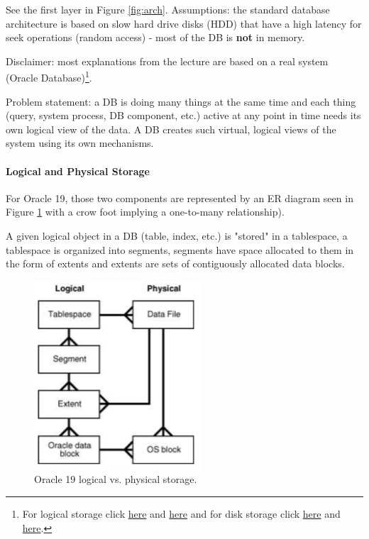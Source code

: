See the first layer in Figure \ref{fig:arch}. Assumptions: the standard database architecture is based on slow hard drive disks (HDD) that have a high latency for seek operations (random access) - most of the DB is \textbf{not} in memory.

Disclaimer: most explanations from the lecture are based on a real system (Oracle Database)\footnote{For logical storage click \href{https://docs.oracle.com/en/database/oracle/oracle-database/19/cncpt/logical-storage-structures.html#GUID-4AF2D61A-8675-4D48-97A4-B20F401ADA16}{here} and \href{https://docs.oracle.com/cd/B19306_01/server.102/b14220/logical.htm}{here} and for disk storage click \href{https://docs.oracle.com/cd/B19306_01/server.102/b14220/physical.htm}{here} and \href{https://docs.oracle.com/en/database/oracle/oracle-database/19/cncpt/physical-storage-structures.html#GUID-008A1F08-9C75-4E9F-A70B-41FB942C60B4}{here}.}. %

Problem statement: a DB is doing many things at the same time and each thing (query, system process, DB component, etc.) active at any point in time needs its own logical view of the data. A DB creates such virtual, logical views of the system using its own mechanisms.

\paragraph{Logical and Physical Storage}
For Oracle 19, those two components are represented by an ER diagram seen in Figure \ref{fig:erdiag} with a crow foot implying a one-to-many relationship). 

A given logical object in a DB (table, index, etc.) is "stored" in a tablespace, a tablespace is organized into segments, segments have space allocated to them in the form of extents and extents are sets of contiguously allocated data blocks.

\begin{figure}[h]
	\centering
	\includegraphics[scale=0.8]{images/1-erdiag.PNG}
	\caption{Oracle 19 logical vs. physical storage.}
	\label{fig:erdiag}
\end{figure}

